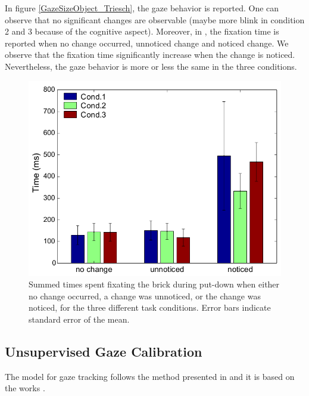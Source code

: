 \documentclass[11pt,a4paper]{article}
\begin{document}
In figure \ref{GazeSizeObject_Triesch}, the gaze behavior is reported. One can observe that no significant changes are observable (maybe more blink in condition 2 and 3 because of the cognitive aspect). Moreover, in \cite{Triesh2003}, the fixation time is reported when no change occurred, unnoticed change and noticed change. We observe that the fixation time significantly increase when the change is noticed. Nevertheless, the gaze behavior is more or less the same in the three conditions.

\begin{figure}[!h]
\centering
\includegraphics[scale=0.35]{Pictures/Fixation_Triesch.png}
\caption{Summed times spent fixating the brick during put-down when either no change occurred, a change was unnoticed, or the change was noticed, for the three different task conditions. Error bars indicate standard error of the mean.  \label{Fixation_Triesch}}
\end{figure}

\subsection{Unsupervised Gaze Calibration}
The model for gaze tracking follows the method presented in \cite{Siegfried2017} and it is based on the works \cite{Funes2016,Funes2014,Yu2017}.
\end{document}
